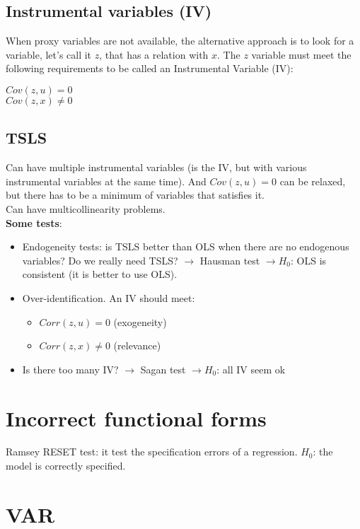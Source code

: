 \documentclass[10pt, a4paper, landscape]{extarticle}
\begin{document}
\begin{multicols}{3}
	\subsection*{Instrumental variables (IV)}
	When proxy variables are not available, the alternative approach is to look for a variable, let's call it $z$, that has a relation with $x$. The $z$ variable must meet the following requirements to be called an Instrumental Variable (IV):
		\begin{center}
			$Cov(z,u) = 0$
			\\ $Cov(z,x) \neq 0$
		\end{center}
	\subsection*{TSLS}
		Can have multiple instrumental variables (is the IV, but with various instrumental variables at the same time). And $Cov(z,u) = 0$ can be relaxed, but there has to be a minimum of variables that satisfies it.
		\\ Can have multicollinearity problems.
		\\ \textbf{Some tests}:
		\begin{itemize}[leftmargin=*]
			\item Endogeneity tests:  is TSLS better than OLS when there are no endogenous variables? Do we really need TSLS? $\rightarrow$ Hausman test $\rightarrow H_0$: OLS is consistent (it is better to use OLS).
			\item Over-identification. An IV should meet:
			\begin{itemize}[leftmargin=*]
				\item $Corr(z,u) = 0$ (exogeneity)
				\item $Corr(z,x) \neq 0$ (relevance)
			\end{itemize}
			\item Is there too many IV? $\rightarrow$ Sagan test $\rightarrow H_0$: all IV seem ok
		\end{itemize}
	
\columnbreak


\section*{Incorrect functional forms}
	Ramsey RESET test: it test the specification errors of a regression. $H_0$: the model is correctly specified.

\section*{VAR}


\end{multicols}
\end{document}
